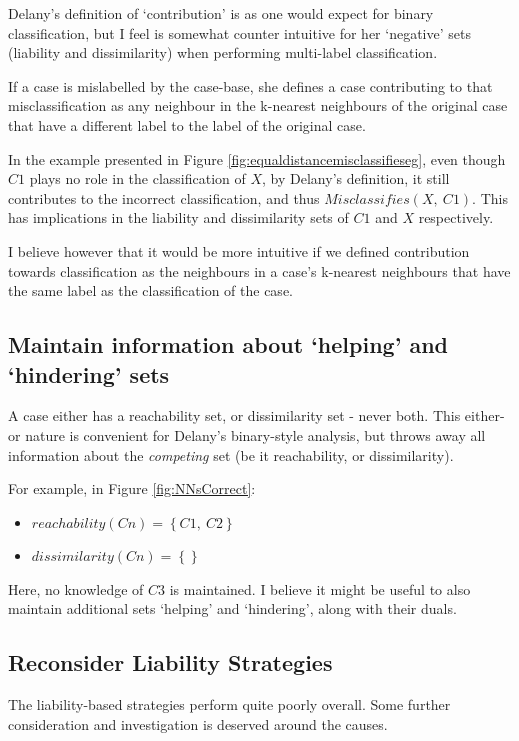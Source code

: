 \documentclass[a4paper,11pt]{report}
\begin{document}
Delany's definition of `contribution' is as one would expect for binary classification, but I feel is somewhat counter intuitive for her `negative' sets (liability and dissimilarity) when performing multi-label classification.

If a case is mislabelled by the case-base, she defines a case contributing to that misclassification as any neighbour in the k-nearest neighbours of the original case that have a different label to the label of the original case. 

In the example presented in Figure \ref{fig:equaldistancemisclassifieseg}, even though $C1$ plays no role in the classification of $X$, by Delany's definition, it still contributes to the incorrect classification, and thus $Misclassifies(X,~C1)$. This has implications in the liability and dissimilarity sets of $C1$ and $X$ respectively. 

I believe however that it would be more intuitive if we defined contribution towards classification as the neighbours in a case's k-nearest neighbours that have the same label as the classification of the case.

\subsection{Maintain information about `helping' and `hindering' sets}
A case either has a reachability set, or dissimilarity set - never both. This either-or nature is convenient for Delany's binary-style analysis, but throws away all information about the \emph{competing} set (be it reachability, or dissimilarity).

For example, in Figure \ref{fig:NNsCorrect}:
\begin{itemize}
	\item $reachability(Cn)=\left\{C1,~C2\right\} $
	\item $dissimilarity(Cn)=\left\{ \right\} $
\end{itemize}

Here, no knowledge of $C3$ is maintained. I believe it might be useful to also maintain additional sets `helping' and `hindering', along with their duals.

\subsection{Reconsider Liability Strategies}
The liability-based strategies perform quite poorly overall. Some further consideration and investigation is deserved around the causes.
\end{document}
